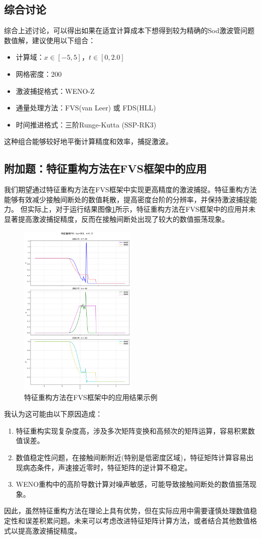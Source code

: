 \documentclass[UTF8]{ctexart}
\begin{document}
\subsection{综合讨论}
综合上述讨论，可以得出如果在适宜计算成本下想得到较为精确的Sod激波管问题数值解，建议使用以下组合：
\begin{itemize}
    \item 计算域：$x \in [-5, 5]$，$t \in [0, 2.0]$
    \item 网格密度：200
    \item 激波捕捉格式：WENO-Z
    \item 通量处理方法：FVS(van Leer) 或 FDS(HLL)
    \item 时间推进格式：三阶Runge-Kutta (SSP-RK3)
\end{itemize}
这种组合能够较好地平衡计算精度和效率，捕捉激波。
\subsection{附加题：特征重构方法在FVS框架中的应用}
我们期望通过特征重构方法在FVS框架中实现更高精度的激波捕捉。特征重构方法能够有效减少接触间断处的数值耗散，提高密度台阶的分辨率，并保持激波捕捉能力。
但实际上，对于运行结果图像\ref{fig:characteristic_effect}所示，特征重构方法在FVS框架中的应用并未显著提高激波捕捉精度，反而在接触间断处出现了较大的数值振荡现象。
\begin{figure}[H]
    \centering
    \includegraphics[width=0.5\textwidth]{characteristic.png}
    \caption{特征重构方法在FVS框架中的应用结果示例}
    \label{fig:characteristic_effect}
\end{figure}
我认为这可能由以下原因造成：
\begin{enumerate}
    \item 特征重构实现复杂度高，涉及多次矩阵变换和高频次的矩阵运算，容易积累数值误差。
    \item 数值稳定性问题，在接触间断附近(特别是低密度区域)，特征矩阵计算容易出现病态条件，声速接近零时，特征矩阵的逆计算不稳定。
    \item WENO重构中的高阶导数计算对噪声敏感，可能导致接触间断处的数值振荡现象。
\end{enumerate}
因此，虽然特征重构方法在理论上具有优势，但在实际应用中需要谨慎处理数值稳定性和误差积累问题。未来可以考虑改进特征矩阵计算方法，或者结合其他数值格式以提高激波捕捉精度。
\end{document}
